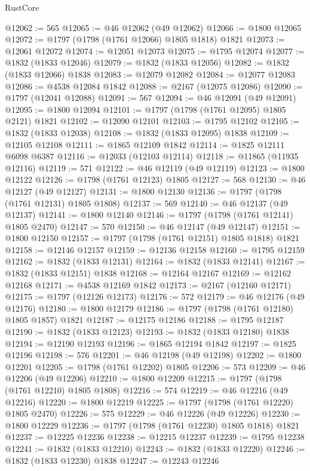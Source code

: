 \begin{lexlean}{RustCore}
\begin{coremodule}
@12062 := 565
@12065 := @46 @12062 (@49 @12062)
@12066 := @1800 @12065
@12072 := @1797 (@1798 (@1761 @12066) @1805 @1818) @1821
@12073 := @12061 @12072
@12074 := @12051 @12073
@12075 := @1795 @12074
@12077 := @1832 (@1833 @12046)
@12079 := @1832 (@1833 @12056)
@12082 := @1832 (@1833 @12066) @1838
@12083 := @12079 @12082
@12084 := @12077 @12083
@12086 := @4538 @12084 @1842
@12088 := @2167 (@12075 @12086)
@12090 := @1797 (@12041 @12088)
@12091 := 567
@12094 := @46 @12091 (@49 @12091)
@12095 := @1800 @12094
@12101 := @1797 (@1798 (@1761 @12095) @1805 @2121) @1821
@12102 := @12090 @12101
@12103 := @1795 @12102
@12105 := @1832 (@1833 @12038)
@12108 := @1832 (@1833 @12095) @1838
@12109 := @12105 @12108
@12111 := @1865 @12109 @1842
@12114 := @1825 @12111 @6098 @6387
@12116 := @12033 (@12103 @12114)
@12118 := @11865 (@11935 @12116)
@12119 := 571
@12122 := @46 @12119 (@49 @12119)
@12123 := @1800 @12122
@12126 := @1798 (@1761 @12123) @1805
@12127 := 568
@12130 := @46 @12127 (@49 @12127)
@12131 := @1800 @12130
@12136 := @1797 (@1798 (@1761 @12131) @1805 @1808)
@12137 := 569
@12140 := @46 @12137 (@49 @12137)
@12141 := @1800 @12140
@12146 := @1797 (@1798 (@1761 @12141) @1805 @2470)
@12147 := 570
@12150 := @46 @12147 (@49 @12147)
@12151 := @1800 @12150
@12157 := @1797 (@1798 (@1761 @12151) @1805 @1818) @1821
@12158 := @12146 @12157
@12159 := @12136 @12158
@12160 := @1795 @12159
@12162 := @1832 (@1833 @12131)
@12164 := @1832 (@1833 @12141)
@12167 := @1832 (@1833 @12151) @1838
@12168 := @12164 @12167
@12169 := @12162 @12168
@12171 := @4538 @12169 @1842
@12173 := @2167 (@12160 @12171)
@12175 := @1797 (@12126 @12173)
@12176 := 572
@12179 := @46 @12176 (@49 @12176)
@12180 := @1800 @12179
@12186 := @1797 (@1798 (@1761 @12180) @1805 @1857) @1821
@12187 := @12175 @12186
@12188 := @1795 @12187
@12190 := @1832 (@1833 @12123)
@12193 := @1832 (@1833 @12180) @1838
@12194 := @12190 @12193
@12196 := @1865 @12194 @1842
@12197 := @1825 @12196
@12198 := 576
@12201 := @46 @12198 (@49 @12198)
@12202 := @1800 @12201
@12205 := @1798 (@1761 @12202) @1805
@12206 := 573
@12209 := @46 @12206 (@49 @12206)
@12210 := @1800 @12209
@12215 := @1797 (@1798 (@1761 @12210) @1805 @1808)
@12216 := 574
@12219 := @46 @12216 (@49 @12216)
@12220 := @1800 @12219
@12225 := @1797 (@1798 (@1761 @12220) @1805 @2470)
@12226 := 575
@12229 := @46 @12226 (@49 @12226)
@12230 := @1800 @12229
@12236 := @1797 (@1798 (@1761 @12230) @1805 @1818) @1821
@12237 := @12225 @12236
@12238 := @12215 @12237
@12239 := @1795 @12238
@12241 := @1832 (@1833 @12210)
@12243 := @1832 (@1833 @12220)
@12246 := @1832 (@1833 @12230) @1838
@12247 := @12243 @12246

\end{coremodule}
\end{lexlean}
